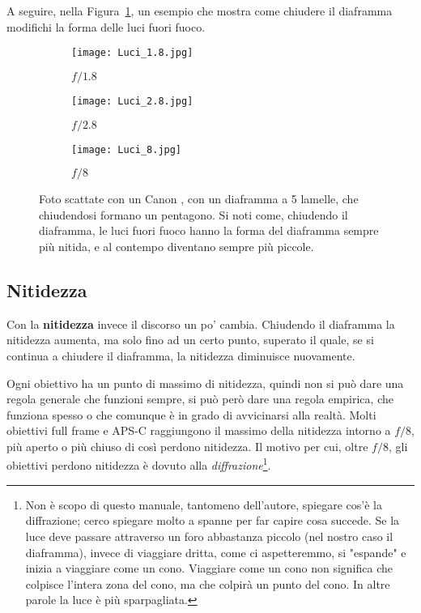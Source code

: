 A seguire, nella Figura~\ref{fig:diaframmaluci}, un esempio che mostra come chiudere il diaframma modifichi la forma delle luci fuori fuoco.

\begin{figure}[H]
    \centering
        \begin{subfigure}{0.33\linewidth}
            \texttt{[image: Luci\_1.8.jpg]}
            \caption{$f/1.8$}
        \end{subfigure}
        \begin{subfigure}{0.33\linewidth}
            \texttt{[image: Luci\_2.8.jpg]}
            \caption{$f/2.8$}
        \end{subfigure}
    
        \begin{subfigure}{0.33\linewidth}
            \texttt{[image: Luci\_8.jpg]}
            \caption{$f/8$}
        \end{subfigure}

    \caption{Foto scattate con un Canon , con un diaframma a 5 lamelle, che chiudendosi formano un pentagono. Si noti come, chiudendo il diaframma, le luci fuori fuoco hanno la forma del diaframma sempre più nitida, e al contempo diventano sempre più piccole.}
    \label{fig:diaframmaluci}
\end{figure}

\subsection{Nitidezza} \label{subsec:diaframmanitidezza}
Con la \textbf{nitidezza} invece il discorso un po' cambia. Chiudendo il diaframma la nitidezza aumenta, ma solo fino ad un certo punto, superato il quale, se si continua a chiudere il diaframma, la nitidezza diminuisce nuovamente.

Ogni obiettivo ha un punto di massimo di nitidezza, quindi non si può dare una regola generale che funzioni sempre, si può però dare una regola empirica, che funziona spesso o che comunque è in grado di avvicinarsi alla realtà.
Molti obiettivi full frame e APS-C raggiungono il massimo della nitidezza intorno a $f/8$, più aperto o più chiuso di così perdono nitidezza.
Il motivo per cui, oltre $f/8$, gli obiettivi perdono nitidezza è dovuto alla \textit{diffrazione}\footnote{Non è scopo di questo manuale, tantomeno dell'autore, spiegare cos'è la diffrazione; cerco spiegare molto a spanne per far capire cosa succede. Se la luce deve passare attraverso un foro abbastanza piccolo (nel nostro caso il diaframma), invece di viaggiare dritta, come ci aspetteremmo, si "espande" e inizia a viaggiare come un cono.  Viaggiare come un cono non significa che colpisce l'intera zona del cono, ma che colpirà un punto del cono. In altre parole la luce è più sparpagliata.}.

